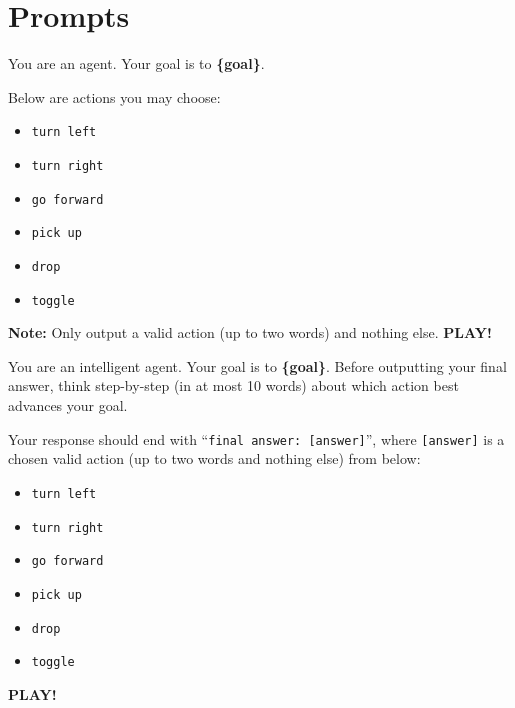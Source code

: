 \documentclass[11pt,a4paper]{article}
\begin{document}
\newpage
\section{Prompts}
\label{appendix:prompts}
\begin{tcolorbox}[
    enhanced,
    title={System Prompt (No Reasoning)},
    fonttitle=\bfseries,
    colback=gray!10,
    colframe=black!50,
    boxrule=0.5pt,
    arc=2pt,
    outer arc=2pt,
    top=2pt,
    bottom=2pt,
    left=4pt,
    right=4pt,
    boxsep=2pt
]
You are an agent. Your goal is to \textbf{\{goal\}}.

Below are actions you may choose:
\begin{itemize}[leftmargin=1.5em, itemsep=0pt, parsep=0pt, topsep=2pt]
  \item \texttt{turn left}
  \item \texttt{turn right}
  \item \texttt{go forward}
  \item \texttt{pick up}
  \item \texttt{drop}
  \item \texttt{toggle}
\end{itemize}

\textbf{Note:} Only output a valid action (up to two words) and nothing else.  
\textbf{PLAY!}
\end{tcolorbox}


\begin{tcolorbox}[
    enhanced,
    title={System Prompt (Reasoning)},
    fonttitle=\bfseries,
    colback=gray!10,
    colframe=black!50,
    boxrule=0.5pt,
    arc=2pt,
    outer arc=2pt,
    top=2pt,
    bottom=2pt,
    left=4pt,
    right=4pt,
    boxsep=2pt
]
You are an intelligent agent. Your goal is to \textbf{\{goal\}}. Before outputting your final answer, think step-by-step (in at most 10 words) about which action best advances your goal.

Your response should end with ``\texttt{final answer: [answer]}'', where \texttt{[answer]} is a chosen valid action (up to two words and nothing else) from below:

\begin{itemize}[leftmargin=1.5em, itemsep=0pt, parsep=0pt, topsep=2pt]
  \item \texttt{turn left}
  \item \texttt{turn right}
  \item \texttt{go forward}
  \item \texttt{pick up}
  \item \texttt{drop}
  \item \texttt{toggle}
\end{itemize}

\textbf{PLAY!}
\end{tcolorbox}
\end{document}
